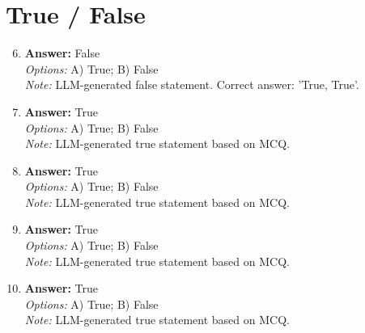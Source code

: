 \documentclass[12pt]{article}
\begin{document}
\section*{True / False}
\begin{enumerate}[label=\arabic*.]
\setcounter{enumi}{5}
\item \textbf{Answer:} False
\\ \textit{Options:} A) True; B) False
\\ \textit{Note:} LLM-generated false statement. Correct answer: 'True, True'.
\item \textbf{Answer:} True
\\ \textit{Options:} A) True; B) False
\\ \textit{Note:} LLM-generated true statement based on MCQ.
\item \textbf{Answer:} True
\\ \textit{Options:} A) True; B) False
\\ \textit{Note:} LLM-generated true statement based on MCQ.
\item \textbf{Answer:} True
\\ \textit{Options:} A) True; B) False
\\ \textit{Note:} LLM-generated true statement based on MCQ.
\item \textbf{Answer:} True
\\ \textit{Options:} A) True; B) False
\\ \textit{Note:} LLM-generated true statement based on MCQ.
\end{enumerate}
\end{document}
